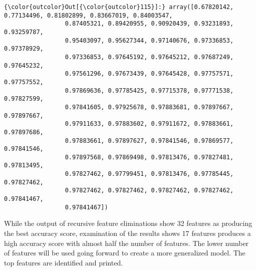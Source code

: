 \documentclass[11pt]{article}
\begin{document}
\begin{Verbatim}[commandchars=\\\{\}]
{\color{outcolor}Out[{\color{outcolor}115}]:} array([0.67820142, 0.77134496, 0.81802899, 0.83667019, 0.84003547,
                 0.87405321, 0.89420955, 0.90920439, 0.93231893, 0.93259787,
                 0.95403097, 0.95627344, 0.97140676, 0.97336853, 0.97378929,
                 0.97336853, 0.97645192, 0.97645212, 0.97687249, 0.97645232,
                 0.97561296, 0.97673439, 0.97645428, 0.97757571, 0.97757552,
                 0.97869636, 0.97785425, 0.97715378, 0.97771538, 0.97827599,
                 0.97841605, 0.97925678, 0.97883681, 0.97897667, 0.97897667,
                 0.97911633, 0.97883602, 0.97911672, 0.97883661, 0.97897686,
                 0.97883661, 0.97897627, 0.97841546, 0.97869577, 0.97841546,
                 0.97897568, 0.97869498, 0.97813476, 0.97827481, 0.97813495,
                 0.97827462, 0.97799451, 0.97813476, 0.97785445, 0.97827462,
                 0.97827462, 0.97827462, 0.97827462, 0.97827462, 0.97841467,
                 0.97841467])
\end{Verbatim}
            
    While the output of recursive feature eliminations show 32 features as
producing the best accuracy score, examination of the results shows 17
features produces a high accuracy score with almost half the number of
features. The lower number of features will be used going forward to
create a more generalized model. The top features are identified and
printed.
\end{document}
